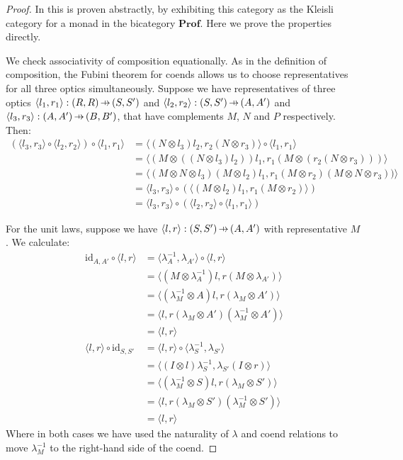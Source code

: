 \documentclass[11pt,a4paper]{article}
\theoremstyle{plain}
\theoremstyle{definition}
\newcommand{\Prof}{\mathbf{Prof}}
\newcommand{\id}{\mathrm{id}}
\newcommand{\hto}{\ensuremath{\,\mathaccent\shortmid\rightarrow\,}}
\begin{document}
\begin{proof}
In \cite[Section 6]{Doubles} this is proven abstractly, by exhibiting this category as the Kleisli category for a monad in the bicategory $\Prof$. Here we prove the properties directly.

We check associativity of composition equationally. As in the definition of composition, the Fubini theorem for coends allows us to choose representatives for all three optics simultaneously. Suppose we have representatives of three optics $\langle l_1, r_1\rangle : (R, R) \hto (S, S')$ and $\langle l_2, r_2 \rangle : (S, S') \hto (A, A')$ and $\langle l_3, r_3 \rangle : (A, A') \hto (B, B')$, that have complements $M$, $N$ and $P$ respectively. Then:
\begin{align*}
(\langle l_3, r_3 \rangle \circ \langle l_2, r_2 \rangle) \circ \langle l_1, r_1 \rangle 
&= \langle (N \otimes l_3)l_2, r_2(N \otimes r_3) \rangle \circ \langle l_1, r_1 \rangle \\
&= \langle (M \otimes ((N \otimes l_3)l_2))l_1, r_1(M \otimes (r_2(N \otimes r_3))) \rangle \\
&= \langle (M \otimes N \otimes l_3)(M \otimes l_2)l_1, r_1(M \otimes r_2)(M \otimes N \otimes r_3)) \rangle \\
&= \langle l_3, r_3 \rangle \circ (\langle (M \otimes l_2)l_1, r_1(M \otimes r_2) \rangle) \\
&= \langle l_3, r_3 \rangle \circ (\langle l_2, r_2 \rangle \circ \langle l_1, r_1 \rangle)
\end{align*}

For the unit laws, suppose we have $\langle l, r \rangle : (S, S') \hto (A, A')$ with representative $M$. We calculate:
\begin{align*}
\id_{A, A'} \circ \langle l, r\rangle 
&= \langle \lambda^{-1}_A, \lambda_{A'} \rangle \circ \langle l, r\rangle \\
&= \langle (M \otimes \lambda^{-1}_A) l, r (M\otimes  \lambda_{A'})\rangle \\
&= \langle (\lambda^{-1}_M \otimes  A) l, r (\lambda_M \otimes A')\rangle \\
&= \langle l, r (\lambda_M \otimes A') (\lambda^{-1}_M \otimes A')\rangle \\
&= \langle l, r \rangle  \\
\langle l, r \rangle \circ \id_{S, S'} 
&= \langle l, r \rangle \circ \langle \lambda^{-1}_S, \lambda_{S'}\rangle  \\
&= \langle (I \otimes l)\lambda^{-1}_S, \lambda_{S'} (I \otimes r) \rangle \\
&= \langle (\lambda^{-1}_M \otimes S)l, r (\lambda_{M} \otimes S') \rangle \\
&= \langle l, r (\lambda_{M} \otimes S')(\lambda^{-1}_M \otimes S') \rangle \\
&= \langle l, r \rangle
\end{align*}
Where in both cases we have used the naturality of $\lambda$ and coend relations to move $\lambda^{-1}_M$ to the right-hand side of the coend. 
\end{proof}
\end{document}
